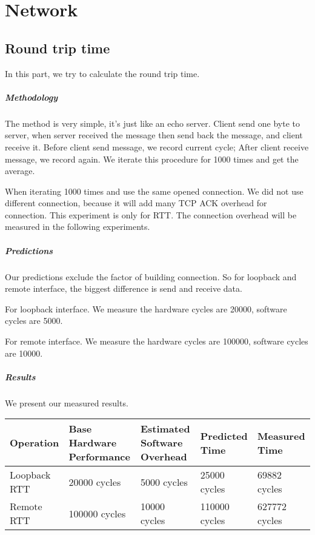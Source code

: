 \chapter{Network}

\section{Round trip time}
In this part, we try to calculate the round trip time.

\paragraph{Methodology}
The method is very simple, it's just like an echo server. Client send one byte to server, when server received the message then send back the message, and client receive it. Before client send message, we record current cycle; After client receive message, we record again. We iterate this procedure for 1000 times and get the average.

When iterating 1000 times and use the same opened connection. We did not use different connection, because it will add many TCP ACK overhead for connection. This experiment is only for RTT. The connection overhead will be measured in the following experiments.

\paragraph{Predictions}
Our predictions exclude the factor of building connection. So for loopback and remote interface, the biggest difference is send and receive data.

For loopback interface. We measure the hardware cycles are 20000, software cycles are 5000.

For remote interface. We measure the hardware cycles are 100000, software cycles are 10000.

\paragraph{Results}
We present our measured results.

\begin{center}
\begin{tabular}{| p{3cm} | p{3cm} | p{3cm} | p{3cm} | p{3cm} |}
Operation   & Base Hardware Performance  & Estimated Software Overhead  & Predicted Time  & Measured Time   \\
\hline
Loopback RTT & 20000 cycles& 5000 cycles& 25000 cycles& 69882 cycles\\
Remote RTT & 100000 cycles& 10000 cycles& 110000 cycles& 627772 cycles\\
\end{tabular}
\end{center}

